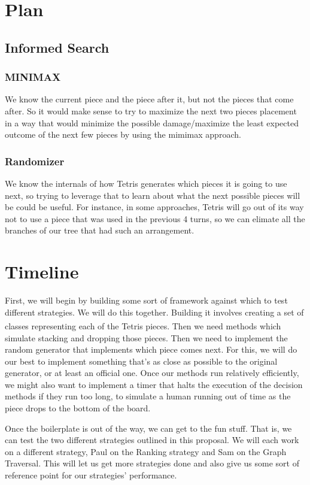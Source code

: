 \documentclass{article}
\def\tetris{Tetris\textsuperscript{\textregistered}}
\begin{document}
\section{Plan}

\subsection{Informed Search}
\subsubsection{MINIMAX} We know the current piece and the piece after it, but not the pieces that come after. So it would make sense to try to maximize the next two pieces placement in a way that would minimize the possible damage/maximize the least expected outcome of the next few pieces by using the mimimax approach.
\subsubsection{Randomizer} We know the internals of how Tetris generates which pieces it is going to use next, so trying to leverage that to learn about what the next possible pieces will be could be useful. For instance, in some approaches, Tetris will go out of its way not to use a piece that was used in the previous 4 turns, so we can elimate all the branches of our tree that had such an arrangement.

\section{Timeline}

\par First, we will begin by building some sort of framework against which to test different strategies. We will do this together. Building it involves creating a set of classes representing each of the \tetris{} pieces. Then we need methods which simulate stacking and dropping those pieces. Then we need to implement the random generator that implements which piece comes next. For this, we will do our best to implement something that's as close as possible to the original generator, or at least an official one. Once our methods run relatively efficiently, we might also want to implement a timer that halts the execution of the decision methods if they run too long, to simulate a human running out of time as the piece drops to the bottom of the board.

\par Once the boilerplate is out of the way, we can get to the fun stuff. That is, we can test the two different strategies outlined in this proposal. We will each work on a different strategy, Paul on the Ranking strategy and Sam on the Graph Traversal. This will let us get more strategies done and also give us some sort of reference point for our strategies' performance.
\end{document}
